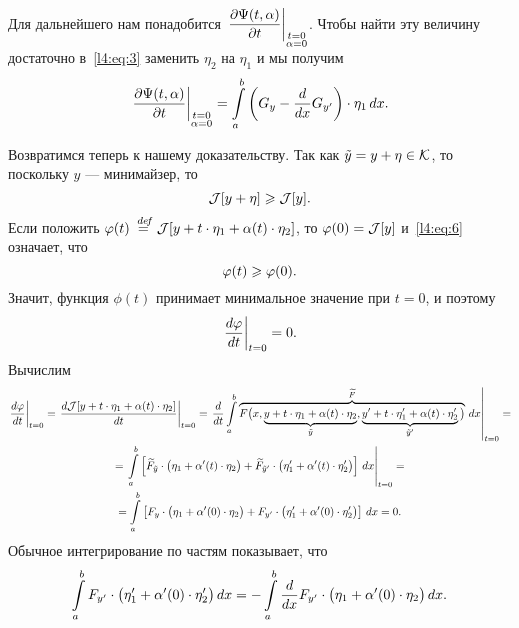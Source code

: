 Для дальнейшего нам понадобится $\displaystyle\left.\frac{\partial\Psi(t,\alpha)}{\partial t}\right|_{\substack{t=0\\\alpha=0}}$. Чтобы найти эту величину достаточно в~\eqref{l4:eq:3} заменить $\eta_2$ на $\eta_1$ и мы получим 
\begin{equation}
	\label{l4:eq:5}
	\hfill\left.\pder{\Psi(t,\alpha)}{t}\right|_{\substack{t=0\\\alpha=0}}=\int\limits_a^b\left(G_y-\der{}{x}G_{y'}\right)\cdot\eta_1\,dx.\hfill
\end{equation}

Возвратимся теперь к нашему доказательству. Так как $\tilde{y}=y+\eta\in\mathcal{K}$, то поскольку $y$ --- минимайзер, то 
\begin{equation}
	\label{l4:eq:6}
	\hfill\J[y+\eta]\geqslant\J[y].\hfill
\end{equation} 
Если положить $\varphi(t)\stackrel{\hspace{0.09 cm}de\!f}{=}\mathcal{J}[y+t\cdot\eta_1+\alpha(t)\cdot\eta_2]$, то $\varphi(0)=\mathcal{J}[y]$ и~\eqref{l4:eq:6} означает, что 
\begin{equation}
	\label{l4:eq:7}
	\hfill\phi(t)\geqslant\phi(0).\hfill
\end{equation} 
Значит, функция $\phi(t)$ принимает минимальное значение при $t=0$, и поэтому 
\begin{equation}
	\label{l4:eq:8}
	\hfill\left.\der{\phi}{t}\right|_{t=0}=0.\hfill
\end{equation} 
Вычислим
\begin{multline}
	\label{l4:eq:9}
	\left.\frac{d\varphi}{dt}\right|_{t=0}=\left.\frac{d\mathcal{J}[y+t\cdot\eta_1+\alpha(t)\cdot\eta_2]}{dt}\right|_{t=0}=\left.\frac{d}{dt}\int\limits_a^b \overbrace{F\big(x,\underbrace{y+t\cdot\eta_1+\alpha(t)\cdot\eta_2}_{\tilde{y}},\underbrace{y'+t\cdot\eta'_1+\alpha(t)\cdot\eta'_2}_{\tilde{y}'}\big)}^{\widetilde{F}}\,dx\right|_{t=0}=\\
	=\left.\int\limits_a^b\left[\widetilde{F}_{\tilde{y}}\cdot\big(\eta_1+\alpha'(t)\cdot\eta_2\big)+\widetilde{F}_{\tilde{y}'}\cdot\big(\eta'_1+\alpha'(t)\cdot\eta'_2\big)\right]\,dx\right|_{t=0}=\\
	=\int\limits_a^b\left[{F}_{{y}}\cdot\big(\eta_1+\alpha'(0)\cdot\eta_2\big)+{F}_{y'}\cdot\big(\eta'_1+\alpha'(0)\cdot\eta'_2\big)\right]\,dx=0.
\end{multline}
Обычное интегрирование по частям показывает, что
\begin{equation}
	\label{l4:eq:10}
	\hfill\int\limits_a^b F_{y'}\cdot\big(\eta'_1+\alpha'(0)\cdot\eta'_2\big)\,dx=-\int\limits_a^b\der{}{x}F_{y'}\cdot\big(\eta_1+\alpha'(0)\cdot\eta_2\big)\,dx.\hfill
\end{equation}
